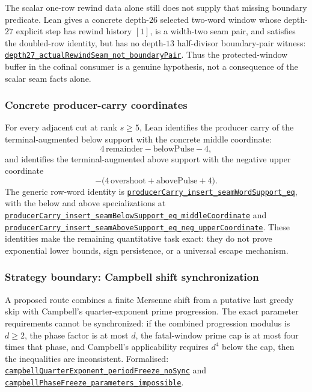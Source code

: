 \documentclass[11pt]{article}
\newcommand{\commit}{81150c1c6fdd4cd51e76d3aa0de344341e0e9e7c}
\newcommand{\repobase}{https://github.com/wcook04/plectis-lean-erdos249-257/blob/\commit}
\newcommand{\PK}{Erdos249257}
\newcommand{\lref}[3]{\href{\repobase/\PK/#1\#L#2}{\nolinkurl{#3}}}
\newcommand{\lrefx}[3]{\href{\repobase/\PK/#1\#L#2}{\nolinkurl{#3}}}
\theoremstyle{definition}
\theoremstyle{remark}
\begin{document}
The scalar one-row rewind data alone still does not supply that missing
boundary predicate.  Lean gives a concrete depth-$26$ selected two-word
window whose depth-$27$ explicit step has rewind history $[1]$, is a width-two
seam pair, and satisfies the doubled-row identity, but has no depth-$13$
half-divisor boundary-pair witness:
\lrefx{RewindBoundaryPairCounterexample.lean}{169}{depth27_actualRewindSeam_not_boundaryPair}.
Thus the protected-window buffer in the cofinal consumer is a genuine
hypothesis, not a consequence of the scalar seam facts alone.

\subsubsection{Concrete producer-carry coordinates}\label{res:producercarrycoordinates}

For every adjacent cut at rank $s\ge5$, Lean identifies the producer carry of
the terminal-augmented below support with the concrete middle coordinate:
\[
  4\,\mathrm{remainder}-\mathrm{belowPulse}-4,
\]
and identifies the terminal-augmented above support with the negative upper
coordinate
\[
  -\bigl(4\,\mathrm{overshoot}+\mathrm{abovePulse}+4\bigr).
\]
The generic row-word identity is
\lref{HalfCylinderProducerLowerBound.lean}{105}{producerCarry_insert_seamWordSupport_eq},
with the below and above specializations at
\lrefx{HalfCylinderProducerLowerBound.lean}{150}{producerCarry_insert_seamBelowSupport_eq_middleCoordinate}
and
\lrefx{HalfCylinderProducerLowerBound.lean}{183}{producerCarry_insert_seamAboveSupport_eq_neg_upperCoordinate}.
These identities make the remaining quantitative task exact: they do not
prove exponential lower bounds, sign persistence, or a universal escape
mechanism.

\subsubsection{Strategy boundary: Campbell shift synchronization}
\label{res:campbellboundary}

A proposed route combines a finite Mersenne shift from a putative last greedy
skip with Campbell's quarter-exponent prime progression.  The exact parameter
requirements cannot be synchronized: if the combined progression modulus is
$d\ge2$, the phase factor is at most $d$, the fatal-window prime cap is at
most four times that phase, and Campbell's applicability requires
$d^4$ below the cap, then the inequalities are inconsistent.  Formalised:
\lrefx{CampbellShiftSynchronization.lean}{299}{campbellQuarterExponent_periodFreeze_noSync}
and
\lref{CampbellShiftSynchronization.lean}{320}{campbellPhaseFreeze_parameters_impossible}.
\end{document}
